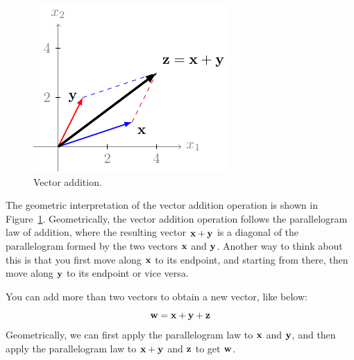 \begin{itemize}
    \begin{figure}[h!]
        \centering
        \includegraphics{figure/chapter01/vec-add-fig.pdf}
        \caption{Vector addition.}
        \label{fig:ch01-vec-add}
    \end{figure}

    The geometric interpretation of the vector addition operation is shown in Figure~\ref{fig:ch01-vec-add}. Geometrically, the vector addition operation follows the parallelogram law of addition, where the resulting vector $\mathbf{x} + \mathbf{y}$ is a diagonal of the parallelogram formed by the two vectors $\mathbf{x}$ and $\mathbf{y}$. Another way to think about this is that you first move along $\mathbf{x}$ to its endpoint, and starting from there, then move along $\mathbf{y}$ to its endpoint or vice versa.

    You can add more than two vectors to obtain a new vector, like below:
    \[ \mathbf{w} = \mathbf{x} + \mathbf{y} + \mathbf{z} \]
    Geometrically, we can first apply the parallelogram law to $\mathbf{x}$ and $\mathbf{y}$, and then apply the parallelogram law to $\mathbf{x} + \mathbf{y}$ and $\mathbf{z}$ to get $\mathbf{w}$.
\end{itemize}


